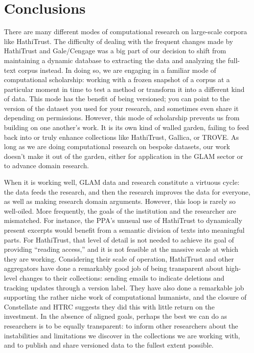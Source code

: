 \documentclass{anthology-ch}         %
\begin{document}
\section{Conclusions}

There are many different modes of computational research on large-scale corpora like HathiTrust. The difficulty of dealing with the frequent changes made by HathiTrust and Gale/Cengage was a big part of our decision to shift from maintaining a dynamic database to extracting the data and analyzing the full-text corpus instead. In doing so, we are engaging in a familiar mode of computational scholarship: working with a frozen snapshot of a corpus at a particular moment in time to test a method or transform it into a different kind of data. This mode has the benefit of being versioned; you can point to the version of the dataset you used for your research, and sometimes even share it depending on permissions. However, this mode of scholarship prevents us from building on one another’s work. It is its own kind of walled garden, failing to feed back into or truly enhance collections like HathiTrust, Gallica, or TROVE. As long as we are doing computational research on bespoke datasets, our work doesn’t make it out of the garden, either for application in the GLAM sector or to advance domain research. 

When it is working well, GLAM data and research constitute a virtuous cycle: the data feeds the research, and then the research improves the data for everyone, as well as making research domain arguments. However, this loop is rarely so well-oiled. More frequently, the goals of the institution and the researcher are mismatched. For instance, the PPA’s unusual use of HathiTrust to dynamically present excerpts would benefit from a semantic division of texts into meaningful parts. For HathiTrust, that level of detail is not needed to achieve its goal of providing “reading access,” and it is not feasible at the massive scale at which they are working. Considering their scale of operation, HathiTrust and other aggregators have done a remarkably good job of being transparent about high-level changes to their collections: sending emails to indicate deletions and tracking updates through a version label. They have also done a remarkable job supporting the rather niche work of computational humanists, and the closure of Constellate and HTRC suggests they did this with little return on the investment. In the absence of aligned goals, perhaps the best we can do as researchers is to be equally transparent: to inform other researchers about the instabilities and limitations we discover in the collections we are working with, and to publish and share versioned data to the fullest extent possible. 
\end{document}
